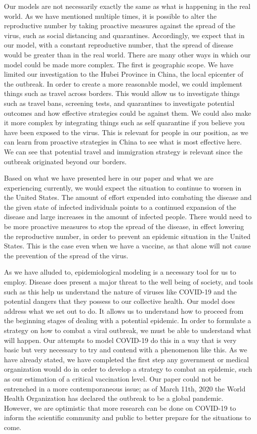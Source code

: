 \documentclass[12pt, a4paper]{article}
\begin{document}
    Our models are not necessarily exactly the same as what is happening in the real world. As we have mentioned multiple times, it is possible to alter the reproductive number by taking proactive measures against the spread of the virus, such as social distancing and quarantines. Accordingly, we expect that in our model, with a constant reproductive number, that the spread of disease would be greater than in the real world. There are many other ways in which our model could be made more complex. The first is geographic scope. We have limited our investigation to the Hubei Province in China, the local epicenter of the outbreak. In order to create a more reasonable model, we could implement things such as travel across borders. This would allow us to investigate things such as travel bans, screening tests, and quarantines to investigate potential outcomes and how effective strategies could be against them. We could also make it more complex by integrating things such as self quarantine if you believe you have been exposed to the virus. This is relevant for people in our position, as we can learn from proactive strategies in China to see what is most effective here. We can see that potential travel and immigration strategy is relevant since the outbreak originated beyond our borders.
    
    Based on what we have presented here in our paper and what we are experiencing currently, we would expect the situation to continue to worsen in the United States. The amount of effort expended into combating the disease and the given state of infected individuals points to a continued expansion of the disease and large increases in the amount of infected people. There would need to be more proactive measures to stop the spread of the disease, in effect lowering the reproductive number, in order to prevent an epidemic situation in the United States. This is the case even when we have a vaccine, as that alone will not cause the prevention of the spread of the virus.
    
    As we have alluded to, epidemiological modeling is a necessary tool for us to employ. Disease does present a major threat to the well being of society, and tools such as this help us understand the nature of viruses like COVID-19 and the potential dangers that they possess to our collective health. Our model does address what we set out to do. It allows us to understand how to proceed from the beginning stages of dealing with a potential epidemic. In order to formulate a strategy on how to combat a viral outbreak, we must be able to understand what will happen. Our attempts to model COVID-19 do this in a way that is very basic but very necessary to try and contend with a phenomenon like this. As we have already stated, we have completed the first step any government or medical organization would do in order to develop a strategy to combat an epidemic, such as our estimation of a critical vaccination level. Our paper could not be entrenched in a more contemporaneous issue; as of March 11th, 2020 the World Health Organization has declared the outbreak to be a global pandemic. However, we are optimistic that more research can be done on COVID-19 to inform the scientific community and public to better prepare for the situations to come.
    
\end{document}
